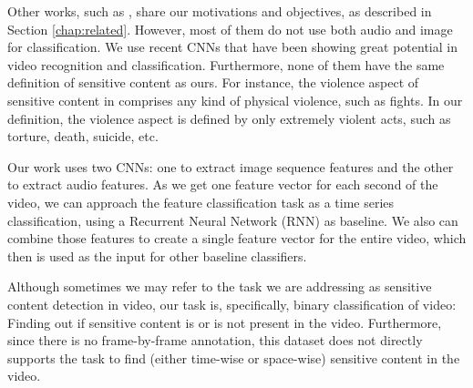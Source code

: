 Other works, such as \cite{moreira2019multimodal}, share our motivations and objectives, as described in Section \ref{chap:related}. However, most of them do not use both audio and image for classification. We use recent CNNs that have been showing great potential in video recognition and classification. Furthermore, none of them have the same definition of sensitive content as ours. For instance, the violence aspect of sensitive content in \cite{moreira2019multimodal} comprises any kind of physical violence, such as fights. In our definition, the violence aspect is defined by only extremely violent acts, such as torture, death, suicide, etc. %

Our work uses two CNNs: one to extract image sequence features and the other to extract audio features.
As we get one feature vector for each second of the video, we can approach the feature classification task as a time series classification, using a Recurrent Neural Network (RNN) as baseline. We also can combine those features to create a single feature vector for the entire video, which then is used as the input for other baseline classifiers.




Although sometimes we may refer to the task we are addressing as sensitive content detection in video, our task is, specifically, binary classification of video: Finding out if sensitive content is or is not present in the video. 
Furthermore, since there is no frame-by-frame annotation, this dataset does not directly supports the task to find (either time-wise or space-wise) sensitive content in the video. 








